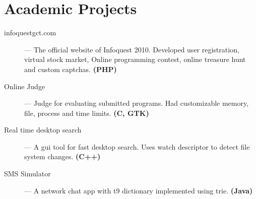 \documentclass{resume}
\begin{document}
\section{Academic Projects}
\begin{description}
  \item[infoquestgct.com] --- The official website of Infoquest 2010. Developed user registration, virtual stock market, Online programming contest, online treasure hunt and custom captchas. \textbf{(PHP)}
  \item[Online Judge] --- Judge for evaluating submitted programs.  Had customizable memory, file, process and time limits. \textbf{(C, GTK)}
  \item[Real time desktop search] --- A gui tool for fast desktop search.  Uses watch descriptor to detect file system changes. \textbf{(C++)}
  \item[SMS Simulator] --- A network chat app with t9 dictionary implemented using trie.  \textbf{(Java)}
\end{description}
\end{document}
